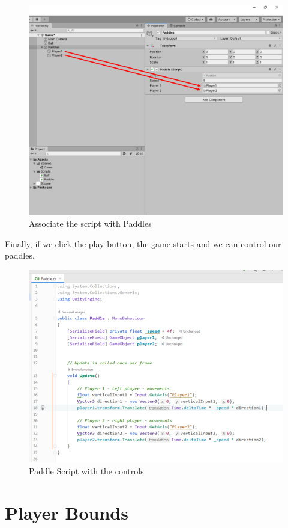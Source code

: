 \documentclass[
]{book}
\begin{document}
\begin{figure}
\centering
\includegraphics{Images/AssociateScript.png}
\caption{Associate the script with Paddles}
\end{figure}

Finally, if we click the play button, the game starts and we can control our paddles.

\begin{figure}
\centering
\includegraphics{Images/PaddleScript.png}
\caption{Paddle Script with the controls}
\end{figure}

\hypertarget{player-bounds}{%
\section{Player Bounds}\label{player-bounds}}
\end{document}

